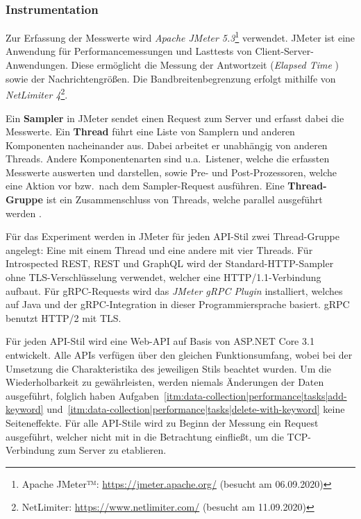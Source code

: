 \subsubsection{Instrumentation}
Zur Erfassung der Messwerte wird \textit{Apache JMeter \textsl{5.3}}\footnote{Apache JMeter™: \url{https://jmeter.apache.org/} (besucht am 06.09.2020)} verwendet. JMeter ist eine Anwendung für Performancemessungen und Lasttests von Client-Server-Anwendungen. Diese ermöglicht die Messung der Antwortzeit (\textit{Elapsed Time} \autocite{JMeterGlossary}) sowie der Nachrichtengrößen. Die Bandbreitenbegrenzung erfolgt mithilfe von \textit{NetLimiter \textsl{4}}\footnote{NetLimiter: \url{https://www.netlimiter.com/} (besucht am 11.09.2020)}.

Ein \textbf{Sampler} in JMeter sendet einen Request zum Server und erfasst dabei die Messwerte. Ein \textbf{Thread} führt eine Liste von Samplern und anderen Komponenten nacheinander aus. Dabei arbeitet er unabhängig von anderen Threads. Andere Komponentenarten sind u.a.\ Listener, welche die erfassten Messwerte auswerten und darstellen, sowie Pre- und Post-Prozessoren, welche eine Aktion vor bzw.\ nach dem Sampler-Request ausführen. Eine \textbf{Thread-Gruppe} ist ein Zusammenschluss von Threads, welche parallel ausgeführt werden \autocite{JMeter_TestPlan}.

Für das Experiment werden in JMeter für jeden API-Stil zwei Thread-Gruppe angelegt: Eine mit einem Thread und eine andere mit vier Threads. Für Introspected REST, REST und GraphQL wird der Standard-HTTP-Sampler ohne TLS-Verschlüsselung verwendet, welcher eine HTTP/1.1-Verbindung aufbaut. Für gRPC-Requests wird das \textit{JMeter gRPC Plugin}\footnotemark{} installiert, welches auf Java und der gRPC-Integration in dieser Programmiersprache basiert. gRPC benutzt HTTP/2 mit TLS\@.


\para{}Für jeden API-Stil wird eine Web-API auf Basis von ASP.NET Core 3.1 entwickelt. Alle APIs verfügen über den gleichen Funktionsumfang, wobei bei der Umsetzung die Charakteristika des jeweiligen Stils beachtet wurden. Um die Wiederholbarkeit zu gewährleisten, werden niemals Änderungen der Daten ausgeführt, folglich haben Aufgaben~\ref{itm:data-collection|performance|tasks|add-keyword} und~\ref{itm:data-collection|performance|tasks|delete-with-keyword} keine Seiteneffekte. Für alle API-Stile wird zu Beginn der Messung ein Request ausgeführt, welcher nicht mit in die Betrachtung einfließt, um die TCP-Verbindung zum Server zu etablieren.

